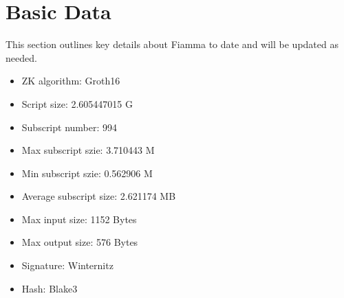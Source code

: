 \section{Basic Data} \label{sec:basic data}
This section outlines key details about Fiamma to date and will be updated as needed.

\begin{itemize}
\item ZK algorithm: Groth16 \cite{website:Groth16}
\item Script size: 2.605447015 G
\item Subscript number: 994
\item Max subscript szie: 3.710443 M 
\item Min subscript szie: 0.562906 M 
\item Average subscript size: 2.621174 MB
\item Max input size: 1152 Bytes
\item Max output size: 576 Bytes
\item Signature: Winternitz
\item Hash: Blake3
\end{itemize}
